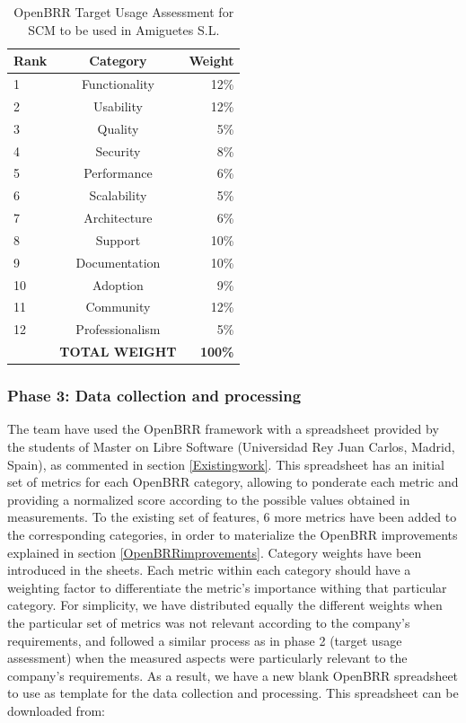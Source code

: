 \documentclass[a4paper,10pt]{article}
\begin{document}
\begin{table}[ht]
\begin{center}
    \begin{tabular}{ | l | c | r |}
    \hline
    \textbf{Rank} & \textbf{Category} & \textbf{Weight} \\ \hline
    1 & Functionality & 12\% \\ \hline
    2 & Usability & 12\% \\ \hline
    3 & Quality & 5\% \\ \hline
    4 & Security & 8\% \\ \hline
    5 & Performance & 6\% \\ \hline
    6 & Scalability & 5\% \\ \hline
    7 & Architecture & 6\% \\ \hline
    8 & Support & 10\% \\ \hline
    9 & Documentation & 10\% \\ \hline
    10 & Adoption & 9\% \\ \hline
    11 & Community & 12\% \\ \hline
    12 & Professionalism & 5\% \\ \hline
     & \textbf{TOTAL WEIGHT} & \textbf{100\%} \\ \hline  
    \end{tabular}
\end{center}
 \caption{OpenBRR Target Usage Assessment for SCM to be used in Amiguetes S.L.}
\label{OpenBRR2}
\end{table}

\subsubsection{Phase 3: Data collection and processing}
The team have used the OpenBRR framework with a spreadsheet provided by the
students of Master on Libre Software (Universidad Rey Juan Carlos, Madrid,
Spain), as commented in section \ref{Existingwork}. This spreadsheet has an
initial set of metrics for each OpenBRR category, allowing to ponderate each
metric and providing a normalized score according to the possible values
obtained in measurements.
To the existing set of features, 6 more metrics have been added to the
corresponding categories, in order to materialize the OpenBRR improvements
explained in section \ref{OpenBRRimprovements}.
Category weights have been introduced in the sheets. Each metric within each
category should have a weighting factor to differentiate the metric's
importance withing that particular category. For simplicity, we have
distributed equally the different weights when the particular set of metrics
was not relevant according to the company's requirements, and followed a
similar process as in phase 2 (target usage assessment) when the measured
aspects were particularly relevant to the company's requirements.
As a result, we have a new blank OpenBRR spreadsheet to use as template for the
data collection and processing. This spreadsheet can be downloaded from:
\end{document}
